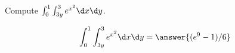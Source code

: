 \documentclass{ximera}
\author{David Guichard \and Neal Koblitz \and H. Jerome Keisler \and Albert Scheller \and Barry Balof \and Mike Wills \and Matthew Carr}
\begin{document}
\begin{exercise}




Compute $\int_{0}^{1}\int_{3y}^{3}e^{x^{2}} \d x\d y$.
\begin{prompt}
\[
\int_{0}^{1}\int_{3y}^{3}e^{x^{2}} \d x\d y=\answer{(e^9-1)/6}
\]
\end{prompt}



\end{exercise}
\end{document}
